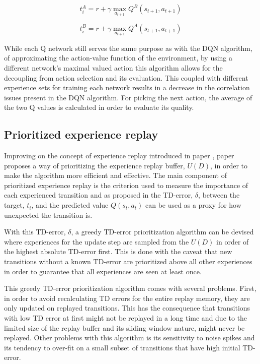 \begin{equation}
    t_i^A = r+\gamma\max\limits_{a_{t+1}}Q^B(s_{t+1}, a_{t+1})
\end{equation}

\begin{equation}
    t_i^B = r+\gamma\max\limits_{a_{t+1}}Q^A(s_{t+1}, a_{t+1})
\end{equation}

While each Q network still serves the same purpose as with the \acrshort{DQN} algorithm, of approximating the action-value function of the environment, by using a different network's maximal valued action this algorithm allows for the decoupling from action selection and its evaluation. This coupled with different experience sets for training each network results in a decrease in the correlation issues present in the \acrshort{DQN} algorithm. For picking the next action, the average of the two Q values is calculated in order to evaluate its quality.

\subsection{Prioritized experience replay}
\noindent Improving on the concept of experience replay introduced in paper \cite{DQN}, paper \cite{prioexperience} proposes a way of prioritizing the experience replay buffer, $U(D)$, in order to make the algorithm more efficient and effective. The main component of prioritized experience replay is the criterion used to measure the importance of each experienced transition and as proposed in \cite{prioexperience} the \acrshort{TD}-error, $\delta$, between the target, $t_i$, and the predicted value $Q(s_t,a_t)$ can be used as a proxy for how unexpected the transition is.

With this \acrshort{TD}-error, $\delta$, a greedy \acrshort{TD}-error prioritization algorithm can be devised where experiences for the update step are sampled from the $U(D)$ in order of the highest absolute \acrshort{TD}-error first. This is done with the caveat that new transitions without a known \acrshort{TD}-error are prioritized above all other experiences in order to guarantee that all experiences are seen at least once.

This greedy \acrshort{TD}-error prioritization algorithm comes with several problems. First, in order to avoid recalculating \acrshort{TD} errors for the entire replay memory, they are only updated on replayed transitions. This has the consequence that transitions with low \acrshort{TD} error at first might not be replayed in a long time and due to the limited size of the replay buffer and its sliding window nature, might never be replayed. Other problems with this algorithm is its sensitivity to noise spikes and its tendency to over-fit on a small subset of transitions that have high initial \acrshort{TD}-error.

